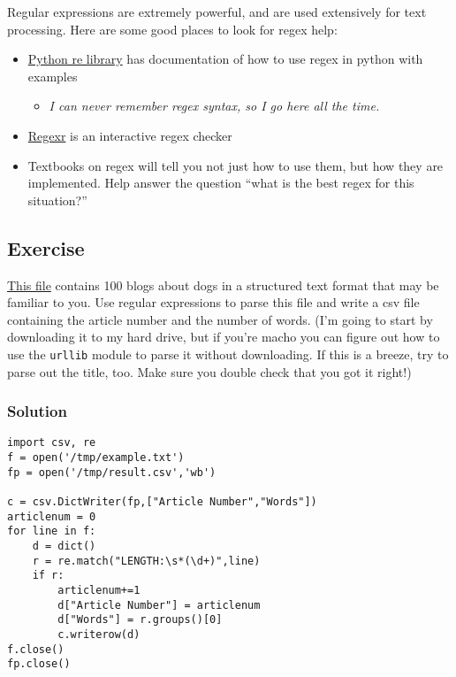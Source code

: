 \documentclass[11pt]{article}
\begin{document}
Regular expressions are extremely powerful, and are used extensively
for text processing.  Here are some good places to look for regex help:
\begin{itemize}
\item \href{http://docs.python.org/library/re.html}{Python re library} has documentation of how to use regex in python with
  examples
\begin{itemize}
\item \emph{I can never remember regex syntax, so I go here all the time.}
\end{itemize}
\item \href{http://gskinner.com/RegExr/}{Regexr} is an interactive regex checker
\item Textbooks on regex will tell you not just how to use them, but how
  they are implemented.  Help answer the question ``what is the best
  regex for this situation?''
\end{itemize}
\subsection{Exercise}
\label{sec-3-4}


\href{file:///Users/astorer/Work/presentations/scraping/example.txt}{This file} contains 100 blogs about dogs in a structured text
format that may be familiar to you.  Use regular expressions to parse
this file and write a csv file containing the article number and
the number of words.  (I'm going to start by downloading it to my hard
drive, but if you're macho you can figure out how to use the \texttt{urllib}
module to parse it without downloading.  If this is a breeze, try to
parse out the title, too.  Make sure you double check that you got it right!)
\subsubsection{Solution}
\label{sec-3-4-1}



\begin{verbatim}
import csv, re
f = open('/tmp/example.txt')
fp = open('/tmp/result.csv','wb')

c = csv.DictWriter(fp,["Article Number","Words"]) 
articlenum = 0
for line in f:
    d = dict()
    r = re.match("LENGTH:\s*(\d+)",line)
    if r:
        articlenum+=1
        d["Article Number"] = articlenum
        d["Words"] = r.groups()[0]
        c.writerow(d)        
f.close()
fp.close()
\end{verbatim}
\end{document}
